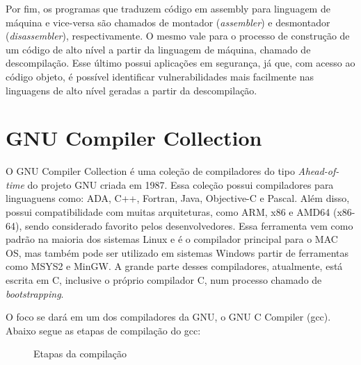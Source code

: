 Por fim, os programas que traduzem código em assembly para linguagem de máquina e vice-versa são chamados de montador (\textit{assembler}) e desmontador (\textit{disassembler}), respectivamente. O mesmo vale para o processo de construção de um código de alto nível a partir da linguagem de máquina, chamado de descompilação. Esse último possui aplicações em segurança, já que, com acesso ao código objeto, é possível identificar vulnerabilidades mais facilmente nas linguagens de alto nível geradas a partir da descompilação.

\section{GNU Compiler Collection}
O GNU Compiler Collection é uma coleção de compiladores do tipo \textit{Ahead-of-time} do projeto GNU criada em 1987. Essa coleção possui compiladores para linguaguens como: ADA, C++, Fortran, Java, Objective-C e Pascal. Além disso, possui compatibilidade com muitas arquiteturas, como ARM, x86 e AMD64 (x86-64), sendo considerado favorito pelos desenvolvedores. Essa ferramenta vem como padrão na maioria dos sistemas Linux e é o compilador principal para o MAC OS, mas também pode ser utilizado em sistemas Windows partir de ferramentas como MSYS2 e MinGW. A grande parte desses compiladores, atualmente, está escrita em C, inclusive o próprio compilador C, num processo chamado de \textit{\gls{bootstrapping}}. 

O foco se dará em um dos compiladores da GNU, o GNU C Compiler (gcc). Abaixo segue as etapas de compilação do gcc:
\begin{figure}[!htbp]\label{fig1_2}
    \centering
    \caption{Etapas da compilação}
\end{figure}

